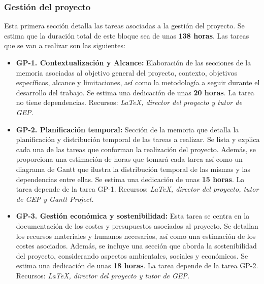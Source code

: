 \subsubsection{Gestión del proyecto}\label{ssec:Descripción de las tareas}
Esta primera sección detalla las tareas asociadas a la gestión del proyecto.
Se estima que la duración total de este bloque sea de unas \textbf{138 horas}. Las tareas que se van a realizar son las siguientes:
\begin{itemize}
    \item \textbf{GP-1. Contextualización y Alcance:} Elaboración de las secciones de la memoria asociadas 
    al objetivo general del proyecto, contexto, objetivos específicos, alcance y limitaciones, así como la metodología 
    a seguir durante el desarrollo del trabajo. Se estima una dedicación de unas \textbf{20 horas}.
    \newline La tarea no tiene dependencias.
    \newline Recursos: \textit {LaTeX, director del proyecto y tutor de GEP.}
    
    \item \textbf{GP-2. Planificación temporal:} Sección de la memoria que detalla la planificación y distribución temporal
    de las tareas a realizar. Se lista y explica cada una de las tareas que conforman la realización del proyecto. Además, se 
    proporciona una estimación de horas que tomará cada tarea así como un diagrama de Gantt que ilustra la distribución 
    temporal de las mismas y las dependencias entre ellas. Se estima una dedicación de unas \textbf{15 horas}. 
    \newline La tarea depende de la tarea GP-1.
    \newline Recursos: \textit {LaTeX, director del proyecto, tutor de GEP y Gantt Project.}
    
    \item \textbf{GP-3. Gestión económica y sostenibilidad:} Esta tarea se centra en la documentación de los costes y presupuestos 
    asociados al proyecto. Se detallan los recursos materiales y humanos necesarios, así como una estimación de los costes 
    asociados. Además, se incluye una sección que aborda la sostenibilidad del proyecto, considerando aspectos ambientales, 
    sociales y económicos. Se estima una dedicación de unas \textbf{18 horas}. 
    \newline La tarea depende de la tarea GP-2.
    \newline Recursos: \textit {LaTeX, director del proyecto y tutor de GEP.}
    

\end{itemize}
